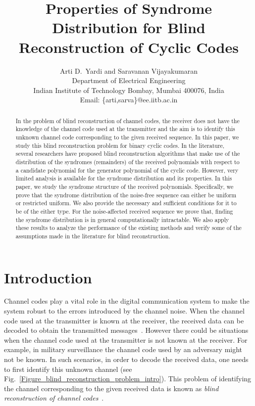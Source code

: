 \documentclass[10pt,journal]{IEEEtran}
\title{Properties of Syndrome Distribution for Blind Reconstruction of Cyclic Codes}
\author{Arti D.~Yardi and Saravanan Vijayakumaran\\
Department of Electrical Engineering \\
Indian Institute of Technology Bombay, Mumbai 400076, India\\
Email: \{arti,sarva\}@ee.iitb.ac.in}
\def \Fig {Fig.}
\begin{document}
\maketitle
% 
\begin{abstract}
% 
In the problem of blind reconstruction of channel codes, the receiver does not have the knowledge of the
channel code used at the transmitter and the aim is to identify this unknown channel code corresponding to the given received sequence.
In this paper, we study this blind reconstruction problem for binary cyclic codes.
% 
In the literature, several researchers have proposed blind reconstruction algorithms that make use of the 
distribution of the syndromes (remainders) of the received polynomials with respect to a candidate polynomial
for the generator polynomial of the cyclic code.
However, very limited analysis is available for the syndrome distribution and its properties.
In this paper, we study the syndrome structure of the received polynomials.
% 
Specifically, we prove that the syndrome distribution of the noise-free sequence can either be uniform or restricted uniform.
We also provide the necessary and sufficient conditions for it to be of the either type.
For the noise-affected received sequence we prove that, finding the syndrome distribution 
is in general computationally intractable.
We also apply these results to analyze the performance of the existing methods and 
verify some of the assumptions made in the literature for blind reconstruction.
% 
% 
\end{abstract}

% 
\section{Introduction}
\label{Introduction_structure}

Channel codes play a vital role in the digital communication system to make the system robust to the errors introduced by the channel noise.
When the channel code used at the transmitter is known at the receiver, the received data can be decoded to obtain the 
transmitted messages~\cite{LinCostello2004}.
However there could be situations when the channel code used at the transmitter is not known at the receiver.
For example, in military surveillance the channel code used by an adversary might not be known. 
In such scenarios, in order to decode the received data, one needs to first identify this unknown 
channel (see \Fig~\ref{Figure_blind_reconstruction_problem_intro}).
This problem of identifying the channel corresponding to the given received data is known as
\textit{blind reconstruction of channel codes}~\cite{Rice95, Planquette96, Filiol97}.
% 
\end{document}
